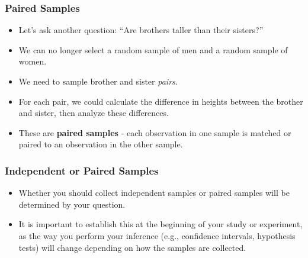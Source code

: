 \documentclass[12pt]{beamer}
\begin{document}
\begin{frame}
	\frametitle{Paired Samples}
	
	\begin{itemize}[label={\color{blue}$\blacktriangleright$}]
		\item Let's ask another question: ``Are brothers taller than their sisters?''
		
		\item We can no longer select a random sample of men and a random sample of women.
		
		\item We need to sample brother and sister \textit{pairs}.
		
		\item For each pair, we could calculate the difference in heights between the brother and sister, then analyze these differences.
		
		\item These are \textbf{paired samples} - each observation in one sample is matched or paired to an observation in the other sample.
	\end{itemize}
	
\end{frame}
\begin{frame}
	\frametitle{Independent or Paired Samples}
	
	\begin{itemize}[label={\color{blue}$\blacktriangleright$}]
		\item Whether you should collect independent samples or paired samples will be determined by your question.
		
		\item It is important to establish this at the beginning of your study or experiment, as the way you perform your inference (e.g., confidence intervals, hypothesis tests) will change depending on how the samples are collected.
	\end{itemize}
	
\end{frame}
\end{document}
